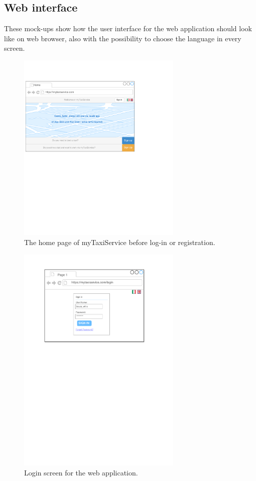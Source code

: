 \subsection{Web interface}
These mock-ups show how the user interface for the web application should look like on web browser, also with the possibility to choose the language in every screen.

\begin{figure}[h]
\centering
\includegraphics[width=0.7\textwidth]{mockup/web/GuestHome}
\caption{The home page of myTaxiService before log-in or registration.}
\label{fig:mockup-guesthome}
\end{figure}

\begin{figure}[h]
\centering
\includegraphics[width=0.7\textwidth]{mockup/web/Login_browser}
\caption{Login screen for the web application.}
\label{fig:mockup-login-browser}
\end{figure}

